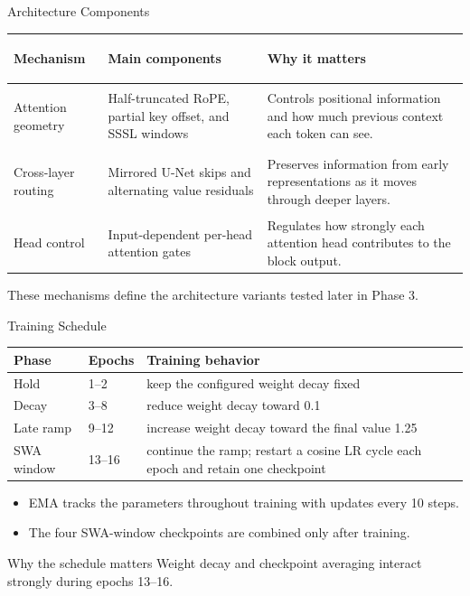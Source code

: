\documentclass[aspectratio=169,11pt]{beamer}
\begin{document}
\begin{frame}{Architecture Components}
  \small
  \renewcommand{\arraystretch}{1.55}
  \begin{tabular}{>{\bfseries\raggedright\arraybackslash}p{}
                  >{\raggedright\arraybackslash}p{}
                  >{\raggedright\arraybackslash}p{}}
    \toprule
    Mechanism & Main components & Why it matters \\
    \midrule
    Attention geometry
      & Half-truncated RoPE, partial key offset, and SSSL windows
      & Controls positional information and how much previous context each token can see. \\
    Cross-layer routing
      & Mirrored U-Net skips and alternating value residuals
      & Preserves information from early representations as it moves through deeper layers. \\
    Head control
      & Input-dependent per-head attention gates
      & Regulates how strongly each attention head contributes to the block output. \\
    \bottomrule
  \end{tabular}
  \vspace{0.55cm}
  \begin{center}
    These mechanisms define the architecture variants tested later in Phase 3.
  \end{center}
\end{frame}

\begin{frame}{Training Schedule}
  \small
  \begin{tabular}{p{}p{}p{}}
    \toprule
    Phase & Epochs & Training behavior \\
    \midrule
    Hold & 1--2 & keep the configured weight decay fixed \\
    Decay & 3--8 & reduce weight decay toward 0.1 \\
    Late ramp & 9--12 & increase weight decay toward the final value 1.25 \\
    SWA window & 13--16 & continue the ramp; restart a cosine LR cycle each
      epoch and retain one checkpoint \\
    \bottomrule
  \end{tabular}
  \par
  \vspace{0.45cm}
  \begin{itemize}
    \item EMA tracks the parameters throughout training with updates every 10 steps.
    \item The four SWA-window checkpoints are combined only after training.
  \end{itemize}
  \vspace{0.2cm}
  \begin{block}{Why the schedule matters}
    Weight decay and checkpoint averaging interact strongly during epochs 13--16.
  \end{block}
\end{frame}
\end{document}

